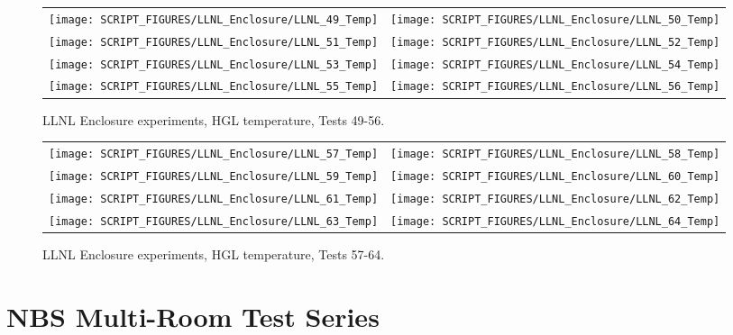 \begin{figure}[p]
\begin{tabular*}{\textwidth}{l@{\extracolsep{\fill}}r}
\texttt{[image: SCRIPT\_FIGURES/LLNL\_Enclosure/LLNL\_49\_Temp]} &
\texttt{[image: SCRIPT\_FIGURES/LLNL\_Enclosure/LLNL\_50\_Temp]} \\
\texttt{[image: SCRIPT\_FIGURES/LLNL\_Enclosure/LLNL\_51\_Temp]} &
\texttt{[image: SCRIPT\_FIGURES/LLNL\_Enclosure/LLNL\_52\_Temp]} \\
\texttt{[image: SCRIPT\_FIGURES/LLNL\_Enclosure/LLNL\_53\_Temp]} &
\texttt{[image: SCRIPT\_FIGURES/LLNL\_Enclosure/LLNL\_54\_Temp]} \\
\texttt{[image: SCRIPT\_FIGURES/LLNL\_Enclosure/LLNL\_55\_Temp]} &
\texttt{[image: SCRIPT\_FIGURES/LLNL\_Enclosure/LLNL\_56\_Temp]}
\end{tabular*}
\caption[LLNL Enclosure experiments, HGL temperature, Tests 49-56]
{LLNL Enclosure experiments, HGL temperature, Tests 49-56.}
\label{LLNL_Enclosure_Temp_7}
\end{figure}

\begin{figure}[p]
\begin{tabular*}{\textwidth}{l@{\extracolsep{\fill}}r}
\texttt{[image: SCRIPT\_FIGURES/LLNL\_Enclosure/LLNL\_57\_Temp]} &
\texttt{[image: SCRIPT\_FIGURES/LLNL\_Enclosure/LLNL\_58\_Temp]} \\
\texttt{[image: SCRIPT\_FIGURES/LLNL\_Enclosure/LLNL\_59\_Temp]} &
\texttt{[image: SCRIPT\_FIGURES/LLNL\_Enclosure/LLNL\_60\_Temp]} \\
\texttt{[image: SCRIPT\_FIGURES/LLNL\_Enclosure/LLNL\_61\_Temp]} &
\texttt{[image: SCRIPT\_FIGURES/LLNL\_Enclosure/LLNL\_62\_Temp]} \\
\texttt{[image: SCRIPT\_FIGURES/LLNL\_Enclosure/LLNL\_63\_Temp]} &
\texttt{[image: SCRIPT\_FIGURES/LLNL\_Enclosure/LLNL\_64\_Temp]}
\end{tabular*}
\caption[LLNL Enclosure experiments, HGL temperature, Tests 57-64]
{LLNL Enclosure experiments, HGL temperature, Tests 57-64.}
\label{LLNL_Enclosure_Temp_8}
\end{figure}

\clearpage

\section{NBS Multi-Room Test Series}

